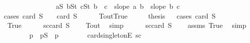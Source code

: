 \begin{isabellebody}
\ \ \ \ \ \ \ \ \ \ \ \ \ \ \ {\isacharparenleft}{\kern0pt}{\isasymforall}a{\isasymin}S{}{\isachardot}{\kern0pt}\ {\isasymforall}b{\isasymin}S{}t{\isachardot}{\kern0pt}\ {\isasymforall}c{\isasymin}S{}t{\isachardot}{\kern0pt}\ b\ {\isacharless}{\kern0pt}\ c\ {\isasymlongrightarrow}\ slope\ a\ b\ {\isachargreater}{\kern0pt}\ slope\ b\ c{\isacharparenright}{\kern0pt}\ {\isacharparenright}{\kern0pt}{\isachardoublequoteclose}\isanewline
%
\isadelimproof
%
\endisadelimproof
%
\isatagproof
{}\isamarkupfalse%
{\isacharparenleft}{\kern0pt}cases\ {\isachardoublequoteopen}card\ S{}\ {\isacharequal}{\kern0pt}\ {}\ {\isasymor}\ card\ S{}\ {\isacharequal}{\kern0pt}\ {}{\isachardoublequoteclose}{\isacharparenright}{\kern0pt}\isanewline
\ \ \isamarkupfalse%
\ Tout{\isacharcolon}{\kern0pt}True\isanewline
\ \ \isamarkupfalse%
\ \isamarkupfalse%
\ {\isacharquery}{\kern0pt}thesis\isanewline
\ \ \isamarkupfalse%
{\isacharparenleft}{\kern0pt}cases\ {\isachardoublequoteopen}card\ S{}\ {\isasymnoteq}\ {}{\isachardoublequoteclose}{\isacharparenright}{\kern0pt}\isanewline
\ \ \ \ \isamarkupfalse%
\ True\isanewline
\ \ \ \ \isamarkupfalse%
\ s{}{\isacharunderscore}{\kern0pt}c{}{\isacharcolon}{\kern0pt}{\isachardoublequoteopen}card\ S{}\ {\isacharequal}{\kern0pt}\ {}{\isachardoublequoteclose}\ \isamarkupfalse%
\ Tout\ \isamarkupfalse%
\ simp\isanewline
\ \ \ \ \isamarkupfalse%
\ s{}{\isacharunderscore}{\kern0pt}c{}{\isacharcolon}{\kern0pt}{\isachardoublequoteopen}card\ S{}\ {\isasymge}\ {}{\isachardoublequoteclose}\ \isamarkupfalse%
\ assms{\isacharparenleft}{\kern0pt}{}{\isacharparenright}{\kern0pt}\ True\ \isamarkupfalse%
\ simp\isanewline
\ \ \ \ \isamarkupfalse%
\ \isamarkupfalse%
\ p{}\ \ p{}{\isacharcolon}{\kern0pt}{\isachardoublequoteopen}S{}\ {\isacharequal}{\kern0pt}\ {\isacharbraceleft}{\kern0pt}p{}{\isacharbraceright}{\kern0pt}{\isachardoublequoteclose}\isanewline
\ \ \ \ \ \ \isamarkupfalse%
\ card{\isacharunderscore}{\kern0pt}{}{\isacharunderscore}{\kern0pt}singletonE\ s{}{\isacharunderscore}{\kern0pt}c{}\ \isamarkupfalse%

\end{isabellebody}
